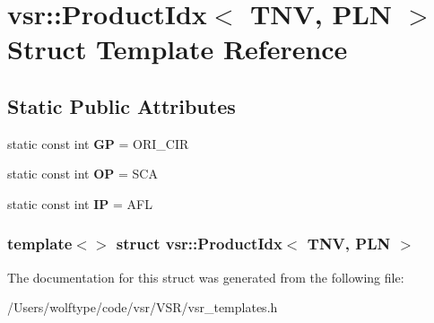 \hypertarget{structvsr_1_1_product_idx_3_01_t_n_v_00_01_p_l_n_01_4}{\section{vsr\-:\-:Product\-Idx$<$ T\-N\-V, P\-L\-N $>$ Struct Template Reference}
\label{structvsr_1_1_product_idx_3_01_t_n_v_00_01_p_l_n_01_4}
}
\subsection*{Static Public Attributes}
\begin{DoxyCompactItemize}
\item 
\hypertarget{structvsr_1_1_product_idx_3_01_t_n_v_00_01_p_l_n_01_4_a235b05a050e7cc36dc4bec2de3b310e5}{static const int {\bfseries G\-P} = O\-R\-I\-\_\-\-C\-I\-R}\label{structvsr_1_1_product_idx_3_01_t_n_v_00_01_p_l_n_01_4_a235b05a050e7cc36dc4bec2de3b310e5}

\item 
\hypertarget{structvsr_1_1_product_idx_3_01_t_n_v_00_01_p_l_n_01_4_afc668592d402086fa4117eea15a05fe0}{static const int {\bfseries O\-P} = S\-C\-A}\label{structvsr_1_1_product_idx_3_01_t_n_v_00_01_p_l_n_01_4_afc668592d402086fa4117eea15a05fe0}

\item 
\hypertarget{structvsr_1_1_product_idx_3_01_t_n_v_00_01_p_l_n_01_4_ac80d5ec80d057558da8fe6cd346c68bf}{static const int {\bfseries I\-P} = A\-F\-L}\label{structvsr_1_1_product_idx_3_01_t_n_v_00_01_p_l_n_01_4_ac80d5ec80d057558da8fe6cd346c68bf}

\end{DoxyCompactItemize}
\subsubsection*{template$<$$>$ struct vsr\-::\-Product\-Idx$<$ T\-N\-V, P\-L\-N $>$}



The documentation for this struct was generated from the following file\-:\begin{DoxyCompactItemize}
\item 
/\-Users/wolftype/code/vsr/\-V\-S\-R/vsr\-\_\-templates.\-h\end{DoxyCompactItemize}
